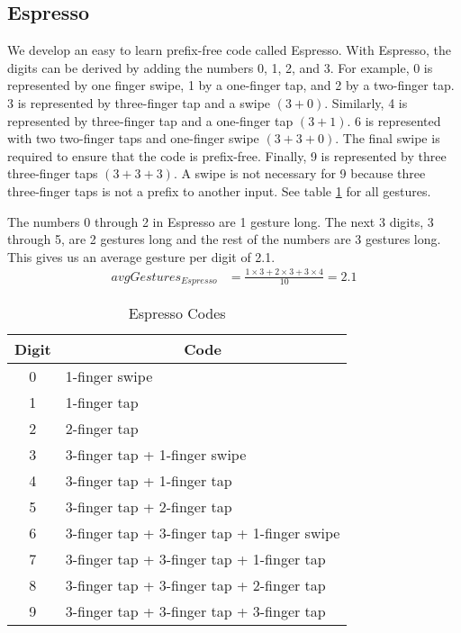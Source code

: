 \subsection{Espresso}
We develop an easy to learn prefix-free code called Espresso. With Espresso, the digits can be derived by adding the numbers 0, 1, 2, and 3. For example, 0 is represented by one finger swipe, 1 by a one-finger tap, and 2 by a two-finger tap. 3 is represented by three-finger tap and a swipe $(3+0)$. Similarly, 4 is represented by three-finger tap and a one-finger tap $(3+1)$. 6 is represented with two two-finger taps and one-finger swipe $(3+3+0)$. The final swipe is required to ensure that the code is prefix-free. Finally, 9 is represented by three three-finger taps $(3+3+3)$. A swipe is not necessary for 9 because three three-finger taps is not a prefix to another input. See table \ref{espresso} for all gestures.
\par
The numbers 0 through 2 in Espresso are 1 gesture long. The next 3 digits, 3 through 5, are 2 gestures long and the rest of the numbers are 3 gestures long. This gives us an average gesture per digit of 2.1.
  \begin{align*}
    avgGestures_{Espresso} &= \frac{1\times3 + 2\times3 + 3\times4}{10} = 2.1
  \end{align*}
  
\begin{table}[ht]
  \caption{Espresso Codes}
  \centering
  \begin{tabular}{cl}
  \hline
  \multicolumn{1}{c}{Digit} & \multicolumn{1}{c}{Code} \\
  \hline
  0 & 1-finger swipe \\
  1 & 1-finger tap \\
  2 & 2-finger tap \\
  3 & 3-finger tap + 1-finger swipe \\
  4 & 3-finger tap + 1-finger tap \\
  5 & 3-finger tap + 2-finger tap \\
  6 & 3-finger tap + 3-finger tap + 1-finger swipe \\
  7 & 3-finger tap + 3-finger tap + 1-finger tap \\
  8 & 3-finger tap + 3-finger tap + 2-finger tap \\
  9 & 3-finger tap + 3-finger tap + 3-finger tap \\ [1ex]
  \hline
  \end{tabular}
  \label{espresso}
\end{table}

